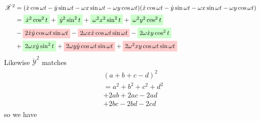\begin{align}
\begin{split}
\dot{\mathscr{X}}^2 &= (\dot{x}\cos{\omega t} - \dot{y}\sin{\omega t} - \omega x\sin{\omega t} - \omega y\cos{\omega t})(\dot{x}\cos{\omega t} - \dot{y}\sin{\omega t} - \omega x\sin{\omega t} - \omega y\cos{\omega t}) \\
&=
\tikz[baseline]{
    \node[fill=green!20,anchor=base]
    {$\dot{x}^2\cos^2{t}$};
} +
\tikz[baseline]{
    \node[fill=green!20,anchor=base]
    {$\dot{y}^2\sin^2{t}$};
} +
\tikz[baseline]{
    \node[fill=green!20,anchor=base]
    {$\omega^2 x^2\sin^2{t}$};
} +
\tikz[baseline]{
    \node[fill=green!20,anchor=base]
    {$\omega^2 y^2\cos^2{t}$};
} \\
&-
\tikz[baseline]{
    \node[fill=red!20,anchor=base]
    {$2 \dot{x}\dot{y}\cos{\omega t}\sin{\omega t}$};
} -
\tikz[baseline]{
    \node[fill=red!20,anchor=base]
    {$2 \omega x \dot{x} \cos{\omega t}\sin{\omega t}$};
} -
\tikz[baseline]{
    \node[fill=green!20,anchor=base]
    {$2 \omega \dot{x}y\cos^2{t}$};
} \\
&+
\tikz[baseline]{
    \node[fill=green!20,anchor=base]
    {$2 \omega x \dot{y}\sin^2{t}$};
} +
\tikz[baseline]{
    \node[fill=red!20,anchor=base]
    {$2 \omega y \dot{y}\cos{\omega t}\sin{\omega t}$};
} +
\tikz[baseline]{
    \node[fill=red!20,anchor=base]
    {$2 \omega^2 x y \cos{\omega t}\sin{\omega t}$};
}
\end{split}
\end{align}
Likewise $\dot{\mathscr{Y}}^2$ matches
\begin{align}
\begin{split}
&(a + b + c - d)^2 \\
&= a^2 + b^2 +c^2 +d^2 \\
&+ 2 a b + 2 a c - 2 a d \\
&+ 2 b c - 2 b d - 2 c d 
\end{split}
\end{align}
so we have
